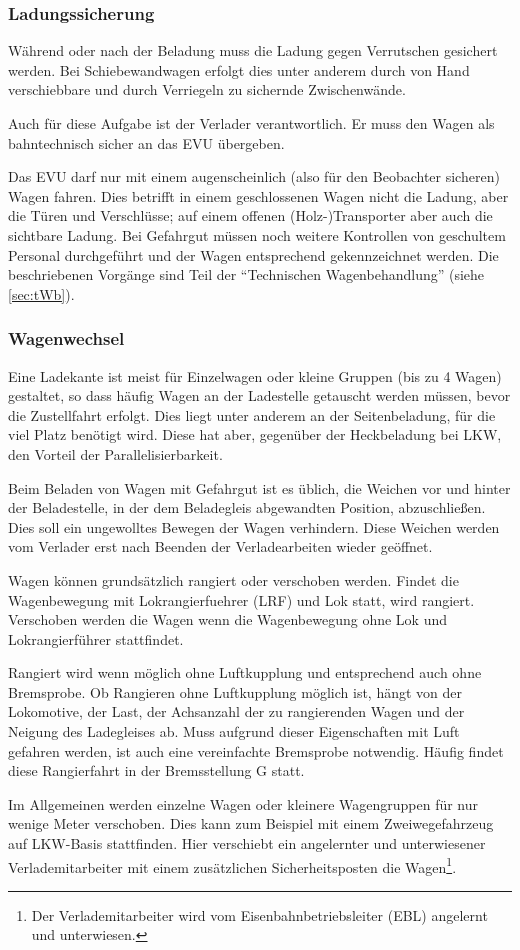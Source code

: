 \subsubsection{Ladungssicherung}
Während oder nach der Beladung muss die Ladung gegen Verrutschen gesichert werden. Bei Schiebewandwagen erfolgt dies unter anderem durch von Hand verschiebbare und durch Verriegeln zu sichernde Zwischenwände.\par
Auch für diese Aufgabe ist der Verlader verantwortlich. Er muss den Wagen als bahntechnisch sicher an das \acrshort{EVU} übergeben. \par
Das \acrshort{EVU} darf nur mit einem augenscheinlich (also für den Beobachter sicheren) Wagen fahren. Dies betrifft in einem geschlossenen Wagen nicht die Ladung, aber die Türen und Verschlüsse; auf einem offenen (Holz-)Transporter aber auch die sichtbare Ladung. Bei Gefahrgut müssen noch weitere Kontrollen von geschultem Personal durchgeführt und der Wagen entsprechend gekennzeichnet werden. Die beschriebenen Vorgänge sind Teil der "`Technischen Wagenbehandlung"' (siehe \ref{sec:tWb}).
\subsubsection{Wagenwechsel}\label{sec:Wagenwechsel}
Eine Ladekante ist meist für Einzelwagen oder kleine Gruppen (bis zu 4 Wagen) gestaltet, so dass häufig Wagen an der Ladestelle getauscht werden müssen, bevor die Zustellfahrt erfolgt. Dies liegt unter anderem an der Seitenbeladung, für die viel Platz benötigt wird. Diese hat aber, gegenüber der Heckbeladung bei LKW, den Vorteil der Parallelisierbarkeit.%
\par
Beim Beladen von Wagen mit Gefahrgut ist es üblich, die Weichen vor und hinter der Beladestelle, in der dem Beladegleis abgewandten Position, abzuschließen. Dies soll ein ungewolltes Bewegen der Wagen verhindern. Diese Weichen werden vom Verlader erst nach Beenden der Verladearbeiten wieder geöffnet.\par
Wagen können grundsätzlich rangiert oder verschoben werden. Findet die Wagenbewegung mit \gls{Lokrangierfuehrer} (\acrshort{LRF}) und Lok statt, wird rangiert. Verschoben werden die Wagen wenn die Wagenbewegung ohne Lok und Lokrangierführer stattfindet.\par
Rangiert wird wenn möglich ohne Luftkupplung und entsprechend auch ohne \gls{Bremsprobe}. Ob Rangieren ohne Luftkupplung möglich ist, hängt von der Lokomotive, der Last, der Achsanzahl der zu rangierenden Wagen und der Neigung des Ladegleises ab. Muss aufgrund dieser Eigenschaften mit Luft gefahren werden, ist auch eine vereinfachte \gls{Bremsprobe} notwendig. Häufig findet diese Rangierfahrt in der Bremsstellung G statt.\par
Im Allgemeinen werden einzelne Wagen oder kleinere Wagengruppen für nur wenige Meter verschoben. Dies kann zum Beispiel mit einem \gls{Zweiwegefahrzeug} auf LKW-Basis stattfinden. Hier verschiebt ein angelernter und unterwiesener Verlademitarbeiter mit einem zusätzlichen Sicherheitsposten die Wagen\footnote{Der Verlademitarbeiter wird vom \gls{Eisenbahnbetriebsleiter} (\acrshort{EBL}) angelernt und unterwiesen.}.
